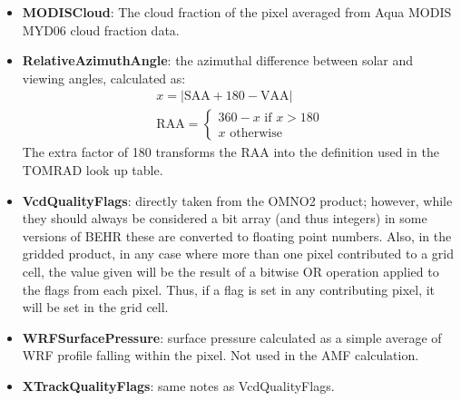 \documentclass[12pt]{article}
\begin{document}
\begin{itemize}
	\item \textbf{MODISCloud}: The cloud fraction of the pixel averaged from Aqua MODIS MYD06 cloud fraction data.
	
	\item \textbf{RelativeAzimuthAngle}: the azimuthal difference between solar and viewing angles, calculated as:
	\begin{align*}
		x = |\mathrm{SAA} + 180 - \mathrm{VAA}| \\
		\mathrm{RAA} = \left\{ 
				\begin{matrix}
					360 - x \text{ if } x > 180 \\
					x	\text{ otherwise}
				\end{matrix}
			\right.
	\end{align*}
	The extra factor of 180 transforms the RAA into the definition used in the TOMRAD look up table.
	
	\item \textbf{VcdQualityFlags}: directly taken from the OMNO2 product; however, while they should always be considered a bit array (and thus integers) in some versions of BEHR these are converted to floating point numbers.  Also, in the gridded product, in any case where more than one pixel contributed to a grid cell, the value given will be the result of a bitwise OR operation applied to the flags from each pixel. Thus, if a flag is set in any contributing pixel, it will be set in the grid cell.
	
	\item \textbf{WRFSurfacePressure}: surface pressure calculated as a simple average of WRF profile falling within the pixel. Not used in the AMF calculation.
	
	\item \textbf{XTrackQualityFlags}: same notes as VcdQualityFlags.
	
	\end{itemize}
\end{document}
